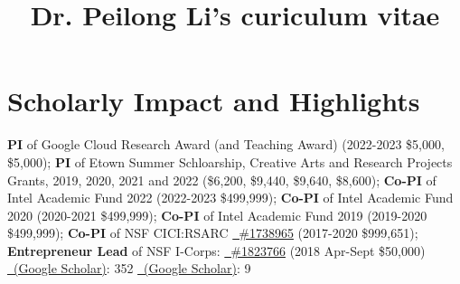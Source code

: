 \documentclass[11pt]{moderncv}
\title{Dr. Peilong Li's curiculum vitae}
\begin{document}
\maketitle

\section{Scholarly Impact and Highlights}
%
{\small 
\textbf{PI} of Google Cloud Research Award (and Teaching Award)
(2022-2023 \$5,000, \$5,000);\newline
\textbf{PI} of Etown Summer Schloarship, Creative Arts and Research Projects Grants, 2019, 2020, 2021 and 2022 (\$6,200, \$9,440, \$9,640, \$8,600); \newline
\textbf{Co-PI} of Intel Academic Fund 2022
   (2022-2023 \$499,999);\newline
\textbf{Co-PI} of Intel Academic Fund 2020
   (2020-2021 \$499,999);\newline
\textbf{Co-PI} of Intel Academic Fund 2019
   (2019-2020 \$499,999);\newline
\textbf{Co-PI} of NSF CICI:RSARC \href{https://nsf.gov/awardsearch/showAward?AWD_ID=1738965}
  {\color{color1}\homepagesymbol~\#1738965} (2017-2020 \$999,651);\newline
\textbf{Entrepreneur Lead} of NSF I-Corps: \href{https://nsf.gov/awardsearch/showAward?AWD_ID=1823766}
  {\color{color1}\homepagesymbol~\#1823766} (2018 Apr-Sept \$50,000)
}
%
%
%
{\small \href{https://scholar.google.com/citations?user=wFIBx94AAAAJ&hl}
  {\color{color2}\homepagesymbol~(Google Scholar)}: 352}
%
%
{\small \href{https://scholar.google.com/citations?user=wFIBx94AAAAJ&hl}
  {\color{color2}\homepagesymbol~(Google Scholar)}: 9}
\end{document}
